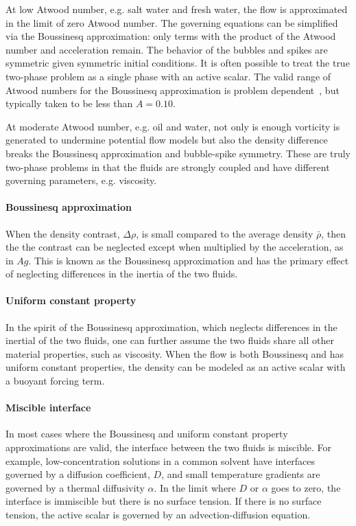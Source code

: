At low Atwood number, e.g. salt water and fresh water, the flow is approximated in the limit of zero Atwood number.
The governing equations can be simplified via the Boussinesq approximation: only terms with the product of the Atwood number and acceleration remain.
The behavior of the bubbles and spikes are symmetric given symmetric initial conditions.
It is often possible to treat the true two-phase problem as a single phase with an active scalar.
The valid range of Atwood numbers for the Boussinesq approximation is problem dependent~\cite{Mikaelian2014}, but typically taken to be less than $A = 0.10$.

At moderate Atwood number, e.g. oil and water, not only is enough vorticity is generated to undermine potential flow models but also the density difference breaks the Boussinesq approximation and bubble-spike symmetry.
These are truly two-phase problems in that the fluids are strongly coupled and have different governing parameters, e.g. viscosity.

\paragraph{Boussinesq approximation}
When the density contrast, $\Delta \rho$, is small compared to the average density $\bar{\rho}$, then 
the the contrast can be neglected except when multiplied by the acceleration, as in $Ag$.
This is known as the Boussinesq approximation and has the primary effect of neglecting differences in the inertia of the two fluids.

\paragraph{Uniform constant property}
In the spirit of the Boussinesq approximation, which neglects differences in the inertial of the two fluids, one can further assume the two fluids share all other material properties, such as viscosity.
When the flow is both Boussinesq and has uniform constant properties, the density can be modeled as an active scalar with a buoyant forcing term.

\paragraph{Miscible interface}
In most cases where the Boussinesq and uniform constant property approximations are valid, the interface between the two fluids is miscible.
For example, low-concentration solutions in a common solvent have interfaces governed by a diffusion coefficient, $D$, and small temperature gradients are governed by a thermal diffusivity $\alpha$.
In the limit where $D$ or $\alpha$ goes to zero, the interface is immiscible but there is no surface tension.
If there is no surface tension, the active scalar is governed by an advection-diffusion equation.

